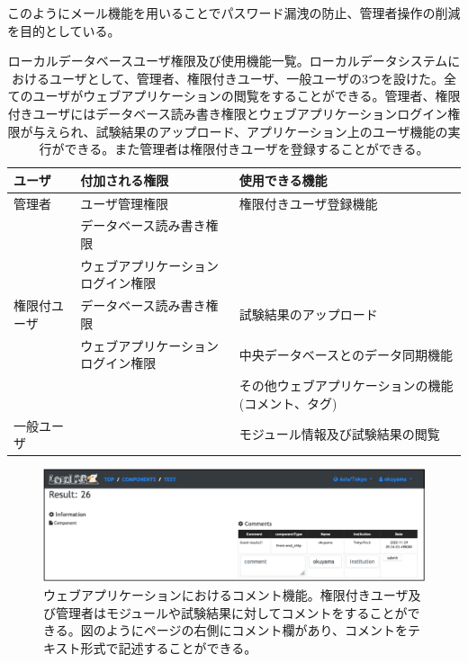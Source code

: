 このようにメール機能を用いることでパスワード漏洩の防止、管理者操作の削減を目的としている。

\clearpage
\begin{table}[btp]
\begin{center}
\caption[ローカルデータベースユーザ権限及び使用機能一覧]{ローカルデータベースユーザ権限及び使用機能一覧。ローカルデータシステムにおけるユーザとして、管理者、権限付きユーザ、一般ユーザの3つを設けた。全てのユーザがウェブアプリケーションの閲覧をすることができる。管理者、権限付きユーザにはデータベース読み書き権限とウェブアプリケーションログイン権限が与えられ、試験結果のアップロード、アプリケーション上のユーザ機能の実行ができる。また管理者は権限付きユーザを登録することができる。}
\label{user_functions_summary}
  \small
  \begin{tabular}{|lll|} \hline
    ユーザ       & 付加される権限                               & 使用できる機能 \\ \hline
    管理者       & ユーザ管理権限                     & 権限付きユーザ登録機能\\ 
                 & データベース読み書き権限           & \\ 
                 & ウェブアプリケーションログイン権限 & \\ \hline
    権限付ユーザ & データベース読み書き権限           & 試験結果のアップロード\\ 
                 & ウェブアプリケーションログイン権限 & 中央データベースとのデータ同期機能\\ 
                 &                                    & その他ウェブアプリケーションの機能(コメント、タグ)\\ \hline
    一般ユーザ   &                                    & モジュール情報及び試験結果の閲覧　\\ \hline
  \end{tabular}
\end{center}
\end{table}

\begin{figure}[btp]\centering
\includegraphics[width=12cm]{./viewer_comment.png}
\caption[ウェブアプリケーションにおけるコメント機能]{ウェブアプリケーションにおけるコメント機能。権限付きユーザ及び管理者はモジュールや試験結果に対してコメントをすることができる。図のようにページの右側にコメント欄があり、コメントをテキスト形式で記述することができる。}
\label{webapp_comment}
\end{figure}


